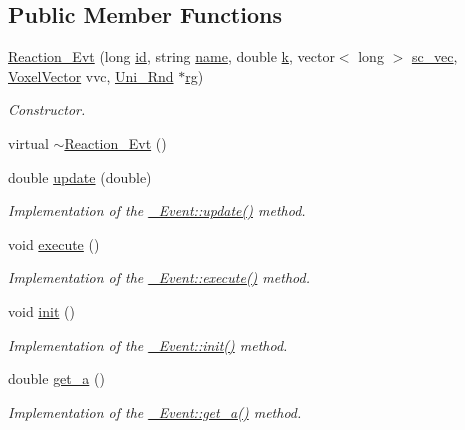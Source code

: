 \subsection*{Public Member Functions}
\begin{DoxyCompactItemize}
\item 
\hyperlink{classnw_1_1_reaction___evt_a582f3c60366d15e89fdd613abe4bd86d}{Reaction\+\_\+\+Evt} (long \hyperlink{classnw_1_1___event_a8f7ce287f596266dd763ec7db2f74090}{id}, string \hyperlink{classnw_1_1___event_ab4f50a54039cd4957bdca55049178562}{name}, double \hyperlink{classnw_1_1___event_afca0ae816e9834add07db8e9a6618faa}{k}, vector$<$ long $>$ \hyperlink{classnw_1_1___event_a560c8b6f9954a43f5d5f80204473b64d}{sc\+\_\+vec}, \hyperlink{namespacenw_ad7146b8b5a9de9be416847f41135722c}{Voxel\+Vector} vvc, \hyperlink{classnw_1_1_uni___rnd}{Uni\+\_\+\+Rnd} $\ast$\hyperlink{classnw_1_1___event_af92482aeea55562560573ecccd5ab108}{rg})
\begin{DoxyCompactList}\small\item\em Constructor. \end{DoxyCompactList}\item 
virtual \hyperlink{classnw_1_1_reaction___evt_a8f8ee0dfc946b6a13e2a1af9b45f6411}{$\sim$\+Reaction\+\_\+\+Evt} ()
\item 
double \hyperlink{classnw_1_1_reaction___evt_aaa2e896edd2263dbe78f5b5aa37fb091}{update} (double)
\begin{DoxyCompactList}\small\item\em Implementation of the \hyperlink{classnw_1_1___event_a882115f8652c881bc8ed43f1050ccba3}{\+\_\+\+Event\+::update()} method. \end{DoxyCompactList}\item 
void \hyperlink{classnw_1_1_reaction___evt_aec2fb342726ef17255ebf406a7c74392}{execute} ()
\begin{DoxyCompactList}\small\item\em Implementation of the \hyperlink{classnw_1_1___event_aa022418fb765582a053ac75cbc3436d6}{\+\_\+\+Event\+::execute()} method. \end{DoxyCompactList}\item 
void \hyperlink{classnw_1_1_reaction___evt_a50daf1db256ed7e0b22a29ffac76a1b6}{init} ()
\begin{DoxyCompactList}\small\item\em Implementation of the \hyperlink{classnw_1_1___event_ae2c608ee2508058d6f318ca2ca8f4317}{\+\_\+\+Event\+::init()} method. \end{DoxyCompactList}\item 
double \hyperlink{classnw_1_1_reaction___evt_a98001b8296e789db3da09791087c4a35}{get\+\_\+a} ()
\begin{DoxyCompactList}\small\item\em Implementation of the \hyperlink{classnw_1_1___event_a75945699f539cefab36eb6693a389918}{\+\_\+\+Event\+::get\+\_\+a()} method. \end{DoxyCompactList}\end{DoxyCompactItemize}
